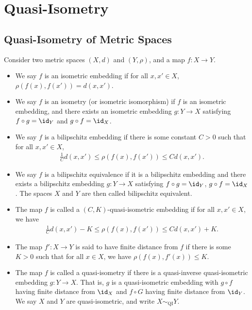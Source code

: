 \documentclass[10pt]{mypackage}
\begin{document}
\section{Quasi-Isometry}%
\subsection{Quasi-Isometry of Metric Spaces}%
\begin{definition}
  Consider two metric spaces $\left( X,d \right)$ and $\left( Y,\rho \right)$, and a map $f\colon X\rightarrow Y$.
  \begin{itemize}
    \item We say $f$ is an isometric embedding if for all $x,x'\in X$, $\rho\left( f\left( x \right),f\left( x' \right) \right) = d\left( x,x' \right)$.
    \item We say $f$ is an isometry (or isometric isomorphism) if $f$ is an isometric embedding, and there exists an isometric embedding $g\colon Y\rightarrow X$ satisfying $f\circ g = \id_Y$ and $g\circ f = \id_X$.
    \item We say $f$ is a bilipschitz embedding if there is some constant $C > 0$ such that for all $x,x'\in X$,
      \begin{align*}
        \frac{1}{C}d\left( x,x' \right)\leq \rho\left( f\left( x \right),f\left( x' \right) \right)\leq Cd\left( x,x' \right).
      \end{align*}
    \item We say $f$ is a bilipschitz equivalence if it is a bilipschitz embedding and there exists a bilipschitz embedding $g\colon Y\rightarrow X$ satisfying $f\circ g = \id_Y$, $g\circ f = \id_X$. The spaces $X$ and $Y$ are then called bilipschitz equivalent.
    \item The map $f$ is called a $\left( C,K \right)$-quasi-isometric embedding if for all $x,x'\in X$, we have
      \begin{align*}
        \frac{1}{C}d\left( x,x' \right)-K \leq \rho\left( f\left( x \right),f\left( x' \right) \right)\leq Cd\left( x,x' \right) + K.
      \end{align*}
    \item The map $f'\colon X\rightarrow Y$ is said to have finite distance from $f$ if there is some $K > 0$ such that for all $x\in X$, we have $\rho\left( f(x),f'(x) \right) \leq K$.
    \item The map $f$ is called a quasi-isometry if there is a quasi-inverse quasi-isometric embedding $g\colon Y\rightarrow X$. That is, $g$ is a quasi-isometric embedding with $g\circ f$ having finite distance from $\id_X$ and $f\circ G$ having finite distance from $\id_Y$. We say $X$ and $Y$ are quasi-isometric, and write $X\sim_{\operatorname{QI}}Y$.
  \end{itemize}
\end{definition}
\end{document}
